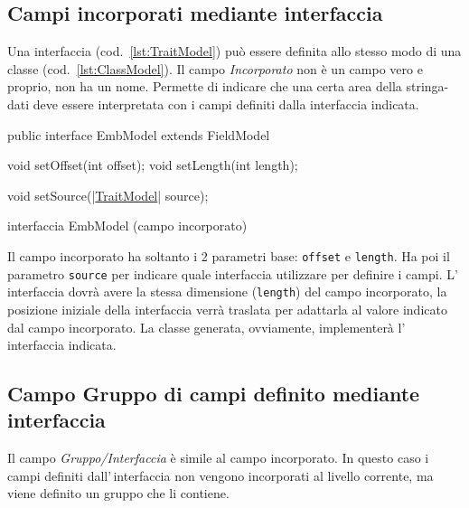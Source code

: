 \documentclass[a4paper,10pt]{report}
\newif\ifesource
\newenvironment{elisting}[1][!htb]
  {\captionsetup{aboveskip=0pt}\begin{listing}[#1]}
  {\end{listing}%
}
\begin{document}
\subsection{Campi incorporati mediante interfaccia}
Una interfaccia (cod.~\ref{lst:TraitModel}) può essere definita allo stesso modo
di una classe (cod.~\ref{lst:ClassModel}).
Il campo \textsl{Incorporato} non è un campo vero e proprio, non ha un nome.
Permette di indicare che una certa area della stringa-dati deve essere 
interpretata con i campi definiti dalla interfaccia indicata.

\ifesource
\begin{figure*}[!htb]
\begin{lstlisting}[language=java, 
caption=interfaccia EmbModel (campo incorporato), 
label=lst:EmbModel]
public interface EmbModel extends FieldModel {
    void setOffset(int offset);
    void setLength(int length);
    
    void setSource((*\hyperref[lst:TraitModel]{TraitModel}*) source);
}
\end{lstlisting}\index{EmbModel}
\end{figure*}
\else
\begin{elisting}
\begin{javacode}
public interface EmbModel extends FieldModel {
    void setOffset(int offset);
    void setLength(int length);
    
    void setSource(|\hyperref[lst:TraitModel]{TraitModel}| source);
}
\end{javacode}
\caption{interfaccia EmbModel (campo incorporato)}
\label{lst:EmbModel}
\end{elisting}
\fi
Il campo incorporato ha soltanto i 2 parametri base: \verb!offset! e 
\verb!length!.
Ha poi il parametro \verb!source! per indicare quale interfaccia utilizzare per
definire i campi. L'\,interfaccia dovrà avere la stessa dimensione 
(\verb!length!) del campo incorporato, la posizione iniziale della interfaccia
verrà traslata per adattarla al valore indicato dal campo incorporato.
La classe generata, ovviamente, implementerà l'\,interfaccia indicata.

\subsection{Campo Gruppo di campi definito mediante interfaccia} 
Il campo \textsl{Gruppo/Interfaccia} è simile al campo incorporato.
In questo caso i campi definiti dall'\,interfaccia non vengono incorporati al
livello corrente, ma viene definito un gruppo che li contiene.
\end{document}
